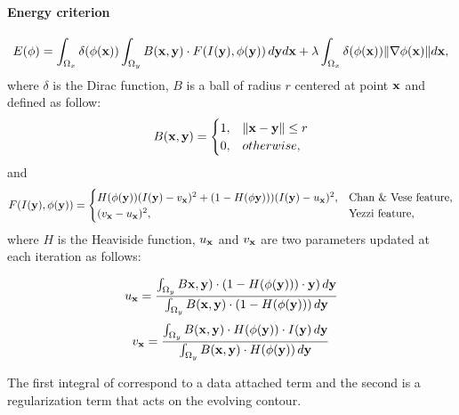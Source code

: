 \paragraph{Energy criterion}
\begin{equation}
	\label{eq:NRJ_lankton}
	E(\phi) = \int_{\Omega_x} \delta(\phi(\mathbf{x})) \int_{\Omega_y} B(\mathbf{x},\mathbf{y}) \cdot F(I(\mathbf{y}), \phi(\mathbf{y})) \, d\mathbf{y}d\mathbf{x} + \lambda \int_{\Omega_x} \delta(\phi(\mathbf{x})) \| \nabla \phi(\mathbf{x}) \|d\mathbf{x},
\end{equation}
where $\delta$ is the Dirac function, $B$ is a ball of radius $r$ centered at point $\mathbf{x}$ and defined as follow:
\begin{equation}
	\label{eq:B}
	B(\mathbf{x},\mathbf{y}) = 
	\begin{cases}
		1, & \|\mathbf{x}-\mathbf{y}\| \leq r \\
		0, & otherwise,
	\end{cases}
\end{equation}
and
\begin{equation}
	\label{eq:F_lankton}
	F(I(\mathbf{y}),\phi(\mathbf{y})) = 
	\begin{cases}
		H(\phi(\mathbf{y}))(I(\mathbf{y}) - v_\mathbf{x})^2 + (1 - H(\phi\mathbf{y})))(I(\mathbf{y}) - u_\mathbf{x})^2, & \text{Chan \& Vese feature,}\\
		(v_\mathbf{x} - u_\mathbf{x})^2, & \text{Yezzi feature,}
	\end{cases}
\end{equation}
where $H$ is the Heaviside function, $u_\mathbf{x}$ and $v_\mathbf{x}$ are two parameters updated at each iteration as follows:

\begin{equation}
	\label{eq:u_lankton}
	u_\mathbf{x} = \frac{\int_{\Omega_y} B\mathbf{x},\mathbf{y}) \cdot (1 - H(\phi(\mathbf{y}))) \cdot \mathbf{y})\, d\mathbf{y}}{\int_{\Omega_y} B(\mathbf{x},\mathbf{y}) \cdot (1 - H(\phi(\mathbf{y}))) \, d\mathbf{y}} 
\end{equation}
\begin{equation}
	\label{eq:v_lankton}
	v_\mathbf{x} = \frac{\int_{\Omega_y} B(\mathbf{x},\mathbf{y}) \cdot H(\phi(\mathbf{y})) \cdot I(\mathbf{y})\, d\mathbf{y}}{\int_{\Omega_y} B(\mathbf{x},\mathbf{y}) \cdot H(\phi(\mathbf{y})) \, d\mathbf{y}} 
\end{equation}

The first integral of  correspond to a data attached term and the second is a regularization term that acts on the evolving contour.

